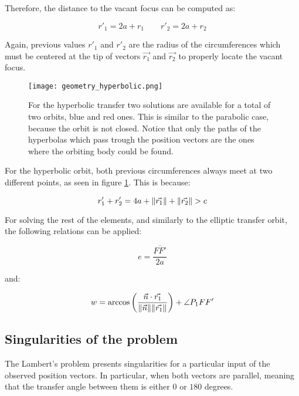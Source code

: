 Therefore, the distance to the vacant focus can be computed as:

\begin{equation}
  r'_{1} = 2a + r_{1}\quad\quad
  r'_{2} = 2a + r_{2}
\end{equation}

Again, previous values $r'_{1}$ and $r'_{2}$ are the radius of the
circumferences which must be centered at the tip of vectors $\vec{r_{1}}$ and
$\vec{r_{2}}$ to properly locate the vacant focus.


\vspace{0.15cm}
\begin{figure}[H]
  \centering
  \texttt{[image: geometry\_hyperbolic.png]}
  \caption{For the hyperbolic transfer two solutions are available for a total
    of two orbits, blue and red ones. This is similar to the parabolic case, because the
    orbit is not closed. Notice that only the paths of the hyperbolas which pass trough the
    position vectors are the ones where the orbiting body could be found.
  }
  \label{fig:hyperbolic_geometry}
\end{figure}

For the hyperbolic orbit, both previous circumferences always meet at two
different points, as seen in figure \ref{fig:hyperbolic_geometry}. This is
because:

\begin{equation}
  r'_{1} + r'_{2} = 4a + \lVert\vec{r_{1}}\rVert + \lVert\vec{r_{2}}\rVert > c
\end{equation}

For solving the rest of the elements, and similarly to the elliptic transfer
orbit, the following relations can be applied:

\begin{equation}
  e = \frac{\overline{FF'}}{2a}
  \label{eq:ellipse_ecc}
\end{equation}

and:

\begin{equation}
  w = \arccos{\left(\frac{\vec{n} \cdot \vec{r_{1}}}{\lVert\vec{n}\rVert
      \lVert\vec{r_{1}}\rVert} \right) + \angle P_{1}FF'}
  \label{eq:hyperbola_w}
\end{equation}


\subsection{Singularities of the problem}
The Lambert's problem presents singularities for a particular input of the
observed position vectors. In particular, when both vectors are parallel,
meaning that the transfer angle between them is either $0$ or $180$ degrees.

